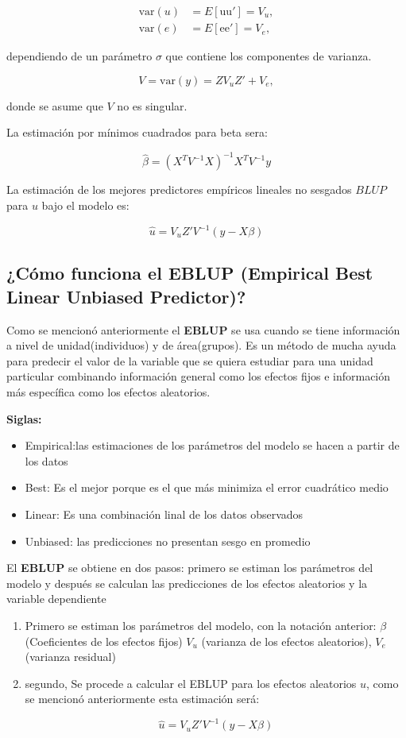 \documentclass[12pt,spanish]{article}
\begin{document}
\begin{align*}
\text{var}(u) &= E[\text{uu}'] = V_u, \\
\text{var}(e) &= E[\text{ee}'] = V_e,
\end{align*}

dependiendo de un parámetro \(\sigma\) que contiene los componentes de varianza. 

\[
V = \text{var}(y) = ZV_uZ' + V_e,
\]

donde se asume que \(V\) no es singular.

La estimación por mínimos cuadrados para beta sera:

$$\hat{\beta} = (X^T V^{-1} X)^{-1} X^T V^{-1} y
$$

La estimación de los mejores predictores empíricos lineales no sesgados $BLUP$ para $u$ bajo el modelo es:

$$\hat{u} = V_u Z' V^{-1} (y - X\beta)
$$
\subsection*{¿Cómo funciona el EBLUP (Empirical Best Linear Unbiased Predictor)?}

Como se mencionó anteriormente el \textbf{EBLUP} se usa cuando se tiene información a nivel de unidad(individuos) y de área(grupos). Es un método de mucha ayuda para predecir el valor de la variable que se quiera estudiar para una unidad particular combinando información general como los efectos fijos e información más específica como los efectos aleatorios.

\textbf{Siglas:}

\begin{itemize}
    \item Empirical:las estimaciones de los parámetros del modelo se hacen a partir de los datos
    \item Best: Es el mejor porque es el que más minimiza el error cuadrático medio
    \item Linear: Es una combinación linal de los datos observados
    \item Unbiased: las predicciones no presentan sesgo en promedio 
\end{itemize}

El \textbf{EBLUP} se obtiene en dos pasos: primero se estiman los parámetros del modelo y después se calculan las predicciones de los efectos aleatorios y la variable dependiente

\begin{enumerate}
    \item Primero se estiman los parámetros del modelo, con la notación anterior: $\beta$ (Coeficientes de los efectos fijos) $V_u$ (varianza de los efectos aleatorios), $V_e$ (varianza residual)
    \item segundo, Se procede a calcular el EBLUP para los efectos aleatorios $u$, como se mencionó anteriormente esta estimación será: 

\[
\hat{u} = V_u Z' V^{-1} (y - X\beta)
\]
\end{enumerate}
\end{document}
